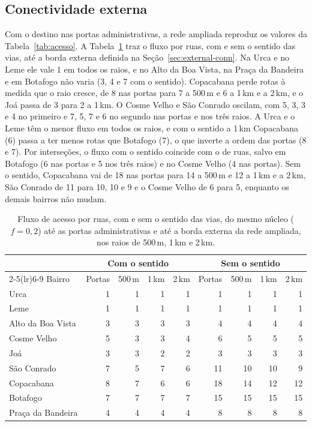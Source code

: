 \subsection{Conectividade externa}
\label{sec:res-external}

Com o destino nas portas administrativas, a rede ampliada reproduz os valores
da Tabela~\ref{tab:acesso}. A Tabela~\ref{tab:externa} traz o fluxo por ruas,
com e sem o sentido das vias, até a borda externa definida na
Seção~\ref{sec:external-conn}. Na Urca e no Leme ele vale 1 em todos os raios,
e no Alto da Boa Vista, na Praça da Bandeira e em Botafogo não varia (3, 4 e 7
com o sentido). Copacabana perde rotas à medida que o raio cresce, de 8 nas
portas para 7 a 500\,m e 6 a 1\,km e a 2\,km, e o Joá passa de 3 para 2 a
1\,km. O Cosme Velho e São Conrado oscilam, com 5, 3, 3 e 4 no primeiro e 7, 5,
7 e 6 no segundo nas portas e nos três raios. A Urca e o Leme têm o menor fluxo
em todos os raios, e com o sentido a 1\,km Copacabana (6) passa a ter menos
rotas que Botafogo (7), o que inverte a ordem das portas (8 e 7). Por
interseções, o fluxo com o sentido coincide com o de ruas, salvo em Botafogo (6
nas portas e 5 nos três raios) e no Cosme Velho (4 nas portas). Sem o sentido,
Copacabana vai de 18 nas portas para 14 a 500\,m e 12 a 1\,km e a 2\,km, São
Conrado de 11 para 10, 10 e 9 e o Cosme Velho de 6 para 5, enquanto os demais
bairros não mudam.

\begin{table}[tbp]
\centering
\caption{Fluxo de acesso por ruas, com e sem o sentido das vias, do mesmo
núcleo ($f=0{,}2$) até as portas administrativas e até a borda externa da rede
ampliada, nos raios de 500\,m, 1\,km e 2\,km.}
\label{tab:externa}
\small
\setlength{\tabcolsep}{4pt}
\begin{tabular}{lrrrrrrrr}
\toprule
 & \multicolumn{4}{c}{Com o sentido} & \multicolumn{4}{c}{Sem o sentido} \\
\cmidrule(lr){2-5}\cmidrule(lr){6-9}
Bairro & Portas & 500\,m & 1\,km & 2\,km & Portas & 500\,m & 1\,km & 2\,km \\
\midrule
Urca              & 1 & 1 & 1 & 1 &  1 &  1 &  1 &  1 \\
Leme              & 1 & 1 & 1 & 1 &  1 &  1 &  1 &  1 \\
Alto da Boa Vista & 3 & 3 & 3 & 3 &  4 &  4 &  4 &  4 \\
Cosme Velho       & 5 & 3 & 3 & 4 &  6 &  5 &  5 &  5 \\
Joá               & 3 & 3 & 2 & 2 &  3 &  3 &  3 &  3 \\
São Conrado       & 7 & 5 & 7 & 6 & 11 & 10 & 10 &  9 \\
Copacabana        & 8 & 7 & 6 & 6 & 18 & 14 & 12 & 12 \\
Botafogo          & 7 & 7 & 7 & 7 & 15 & 15 & 15 & 15 \\
Praça da Bandeira & 4 & 4 & 4 & 4 &  8 &  8 &  8 &  8 \\
\bottomrule
\end{tabular}
\end{table}

